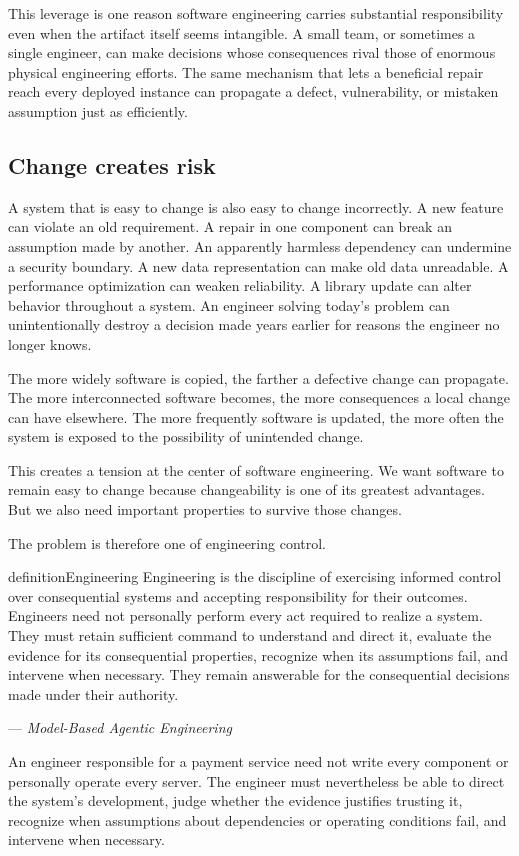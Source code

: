 This leverage is one reason software engineering carries substantial responsibility even when the
artifact itself seems intangible. A small team, or sometimes a single engineer, can make decisions
whose consequences rival those of enormous physical engineering efforts. The same mechanism that lets a
beneficial repair reach every deployed instance can propagate a defect, vulnerability, or mistaken
assumption just as efficiently.

\subsection{Change creates risk}\label{sec-change-creates-risk}

A system that is easy to change is also easy to change incorrectly. A new feature can violate an
old requirement. A repair in one component can break an assumption made by
another. An apparently harmless dependency can undermine a security boundary. A new data representation
can make old data unreadable. A performance optimization can weaken reliability. A library update can
alter behavior throughout a system. An engineer solving today's problem can unintentionally destroy a
decision made years earlier for reasons the engineer no longer knows.

The more widely software is copied, the farther a defective change can propagate. The more
interconnected software becomes, the more consequences a local change can have elsewhere. The more
frequently software is updated, the more often the system is exposed to the possibility of unintended
change.

This creates a tension at the center of software engineering. We want software to remain easy to change
because changeability is one of its greatest advantages. But we also need important properties to
survive those changes.

The problem is therefore one of engineering control.

\begin{bookbox}{definition}{Engineering} %
Engineering is the discipline of exercising informed control over consequential systems and accepting
responsibility for their outcomes. Engineers need not personally perform every act required to realize
a system. They must retain sufficient command to understand and direct it, evaluate the evidence for
its consequential properties, recognize when its assumptions fail, and intervene when necessary. They
remain answerable for the consequential decisions made under their authority.

--- \emph{Model-Based Agentic Engineering} \citep{davis2026mage}

An engineer responsible for a payment service need not write every component or personally operate
every server. The engineer must nevertheless be able to direct the system's development, judge whether
the evidence justifies trusting it, recognize when assumptions about dependencies or operating
conditions fail, and intervene when necessary.
\end{bookbox}

